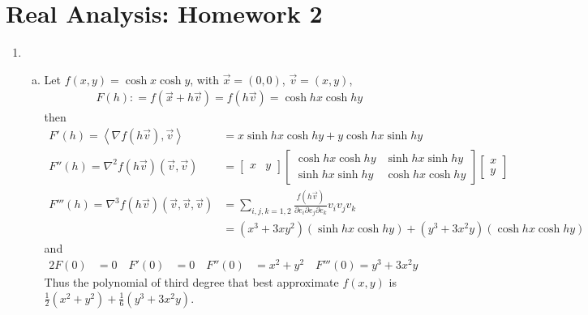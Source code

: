 \documentclass[a4paper,12pt]{article}
\theoremstyle{definition}
\begin{document}
\section*{Real Analysis: Homework 2}

\begin{enumerate}

\item 
\begin{enumerate}[(a)]
\item Let $f(x,y) = \cosh x \cosh y$, with $\vec{x} = (0,0)$, $\vec{v}=(x,y)$,
\begin{align*}
F(h): = f(\vec{x}+h\vec{v}) = f(h\vec{v}) = \cosh hx\cosh hy
\end{align*}
then
\begin{align*}
F'(h)=\left\langle\nabla f(h\vec{v}),\vec{v}\right\rangle  &= x \sinh hx \cosh hy + y \cosh hx \sinh hy\\
F''(h)=\nabla^2 f(h\vec{v})(\vec{v},\vec{v})&=\begin{bmatrix}x & y\end{bmatrix}\begin{bmatrix}\cosh hx \cosh hy & \sinh hx \sinh hy \\ \sinh hx \sinh hy &\cosh hx \cosh hy \end{bmatrix}\begin{bmatrix}x \\ y\end{bmatrix}\\
F'''(h)=\nabla^3 f(h\vec{v})(\vec{v},\vec{v},\vec{v}) &= \sum_{i,j,k=1,2}\frac{f(h\vec{v})}{\partial e_i\partial e_j\partial e_k}v_iv_jv_k \\
&= (x^3 + 3xy^2)(\sinh hx \cosh hy) + (y^3+3x^2y)(\cosh hx \cosh hy)
\end{align*}
and 
\begin{alignat*}{2}
F(0) &= 0 \quad F'(0) &= 0 \quad  F''(0) &= x^2 + y^2 \quad F'''(0) = y^3+3x^2y
\end{alignat*}
Thus the polynomial of third degree that best approximate $f(x,y)$ is $\frac{1}{2}(x^2+y^2)+ \frac{1}{6}(y^3+3x^2y)$.


\end{enumerate}
\end{enumerate}
\end{document}
